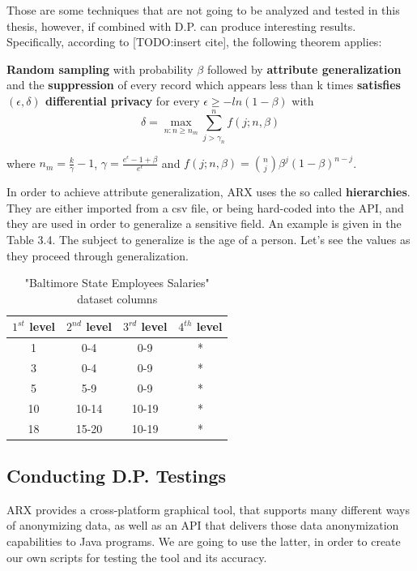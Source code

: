 Those are some techniques that are not going to be analyzed and tested in this thesis, however, if combined with D.P. can produce interesting results. Specifically, according to [TODO:insert cite], the following theorem applies:

\textbf{Random sampling} with probability $\beta$ followed by \textbf{attribute generalization} and the \textbf{suppression} of
every record which appears less than k times \textbf{satisfies $(\epsilon, \delta)$ differential privacy} for every $\epsilon \geq -ln(1-\beta)$ with 
$$\delta = \max_{n:n \geq n_m} \sum_{j>\gamma_n}^{n}f(j;n,\beta)$$

where $n_m = \frac{k}{\gamma} - 1$, $\gamma = \frac{e^\epsilon-1+\beta}{e^\epsilon}$ and $f(j;n,\beta) = {n \choose  j} \beta^j(1-\beta)^{n-j}$.

In order to achieve attribute generalization, ARX uses the so called \textbf{hierarchies}. They are either imported from a csv file, or being hard-coded into the API, and they are used in order to generalize a sensitive field. An example is given in the Table 3.4. The subject to generalize is the age of a person. Let's see the values as they proceed through generalization.

\begin{table}[!htb]
    \centering

    \caption{"Baltimore State Employees Salaries" dataset columns}
    \label{numbers}

    \begin{tabular}{| c | c | c | c |}
      \hline 
      $1^{st}$ level & $2^{nd}$ level & $3^{rd}$ level & $4^{th}$ level\\
      \hline
      1 & 0-4 & 0-9 & *\\
      \hline
      3 & 0-4 & 0-9 & *\\
      \hline
      5 & 5-9 & 0-9 & * \\
      \hline
      10 & 10-14 & 10-19 & *\\
      \hline
      18 & 15-20 & 10-19 & *\\
      \hline
    
    \end{tabular}
\end{table}

\subsection{Conducting D.P. Testings}

ARX provides a cross-platform graphical tool, that supports many different ways of anonymizing data, as well as an API that delivers those data anonymization capabilities to Java programs. We are going to use the latter, in order to create our own scripts for testing the tool and its accuracy.

